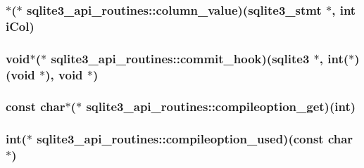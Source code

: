 \hypertarget{structsqlite3__api__routines_a2c5ab2f4eb5458dd17922e6ad6f33ca3}{
\subsubsection[{column\-\_\-value}]{$\ast$($\ast$ sqlite3\-\_\-api\-\_\-routines\-::column\-\_\-value)({\bf sqlite3\-\_\-stmt} $\ast$, int i\-Col)}}\label{structsqlite3__api__routines_a2c5ab2f4eb5458dd17922e6ad6f33ca3}
\hypertarget{structsqlite3__api__routines_a1fd4d534756988a2d709acffeb91d68a}{
\subsubsection[{commit\-\_\-hook}]{\setlength{\rightskip}{0pt plus 5cm}void$\ast$($\ast$ sqlite3\-\_\-api\-\_\-routines\-::commit\-\_\-hook)({\bf sqlite3} $\ast$, int($\ast$)(void $\ast$), void $\ast$)}}\label{structsqlite3__api__routines_a1fd4d534756988a2d709acffeb91d68a}
\hypertarget{structsqlite3__api__routines_a1d94408829d5cc628c2947f321367e80}{
\subsubsection[{compileoption\-\_\-get}]{\setlength{\rightskip}{0pt plus 5cm}const char$\ast$($\ast$ sqlite3\-\_\-api\-\_\-routines\-::compileoption\-\_\-get)(int)}}\label{structsqlite3__api__routines_a1d94408829d5cc628c2947f321367e80}
\hypertarget{structsqlite3__api__routines_a788dd672feeff349c417beff9a7eb26c}{
\subsubsection[{compileoption\-\_\-used}]{\setlength{\rightskip}{0pt plus 5cm}int($\ast$ sqlite3\-\_\-api\-\_\-routines\-::compileoption\-\_\-used)(const char $\ast$)}}\label{structsqlite3__api__routines_a788dd672feeff349c417beff9a7eb26c}
